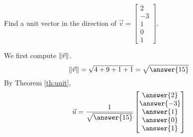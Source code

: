 \documentclass{ximera}
\begin{document}
 



 

 
\begin{example}\label{reference}
Find a unit vector in the direction of $\vec{v}=\begin{bmatrix}2\\-3\\1\\0\\1\end{bmatrix}$.
 
\begin{explanation}
We first compute $\left\|\vec{v}\right\|$.
$$\norm{\vec{v}}=\sqrt{4+9+1+1}=\sqrt{\answer{15}}$$
By Theorem \ref{th:unit},
$$\vec{u}=\frac{1}{\sqrt{\answer{15}}}\begin{bmatrix}\answer{2}\\\answer{-3}\\\answer{1}\\\answer{0}\\\answer{1}\end{bmatrix}$$
\end{explanation}
\end{example}
\end{document}
